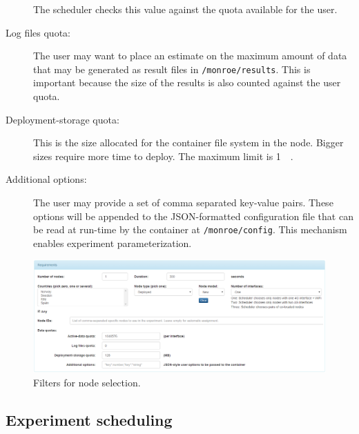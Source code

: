 \documentclass[a4paper,10pt]{article}
\newcommand{\identifier}[1]{{\texttt{\small{#1}}}}
\begin{document}
\begin{description}
	The scheduler checks this value against the quota available for the user.
	\item [Log files quota:] The user may want to place an estimate on the maximum amount of data that may be generated as result files in \identifier{/monroe/results}.
	This is important because the size of the results is also counted against the user quota.
	\item [Deployment-storage quota:] This is the size allocated for the container file system in the node.
	Bigger sizes require more time to deploy.
	The maximum limit is \SI{1}{\giga\byte}.
	\item [Additional options:] The user may provide a set of comma separated key-value pairs.
	These options will be appended to the JSON-formatted configuration file that can be read at run-time by the container at \identifier{/monroe/config}.
	This mechanism enables experiment parameterization.
\end{description}

\begin{figure}[tp]
	\centering
	\includegraphics[width=1.0\textwidth]{NewExperimentFilters.png}
	\caption{Filters for node selection.}
	\label{fig:newExperimentFilters}
\end{figure}

\subsection{Experiment scheduling}
\label{subsec:experimentScheduling}
\end{document}
